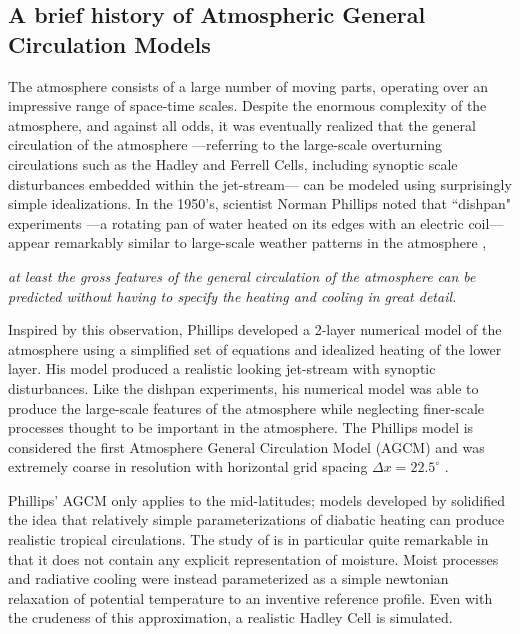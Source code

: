 \subsection{A brief history of Atmospheric General Circulation Models}

The atmosphere consists of a large number of moving parts, operating over an impressive range of space-time scales. Despite the enormous complexity of the atmosphere, and against all odds, it was eventually realized that the general circulation of the atmosphere ---referring to the large-scale overturning circulations such as the Hadley and Ferrell Cells, including synoptic scale disturbances embedded within the jet-stream--- can be modeled using surprisingly simple idealizations. In the 1950's, scientist Norman Phillips noted that  ``dishpan" experiments ---a rotating pan of water heated on its edges with an electric coil--- appear remarkably similar to large-scale weather patterns in the atmosphere \citep{WEART2008},
\begin{displayquote}
{\em{at least the gross features of the general circulation of the atmosphere can be predicted without having to specify the heating and cooling in great detail.}}
\end{displayquote}
Inspired by this observation, Phillips developed a 2-layer numerical model of the atmosphere using a simplified set of equations and idealized heating of the lower layer. His model produced a realistic looking jet-stream with synoptic disturbances. Like the dishpan experiments, his numerical model was able to produce the large-scale features of the atmosphere while neglecting finer-scale processes thought to be important in the atmosphere. The Phillips model is considered the first Atmosphere General Circulation Model (AGCM) and was extremely coarse in resolution with horizontal grid spacing $\Delta x = 22.5^{\circ}$ \citep{WEART2008}.

Phillips' AGCM only applies to the mid-latitudes; models developed by \cite{METAL1965MWR, HH1980JAS} solidified the idea that relatively simple parameterizations of diabatic heating can produce realistic tropical circulations. The study of \cite{HH1980JAS} is in particular quite remarkable in that it does not contain any explicit representation of moisture. Moist processes and radiative cooling were instead parameterized as a simple newtonian relaxation of potential temperature to an inventive reference profile. Even with the crudeness of this approximation, a realistic Hadley Cell is simulated. 

